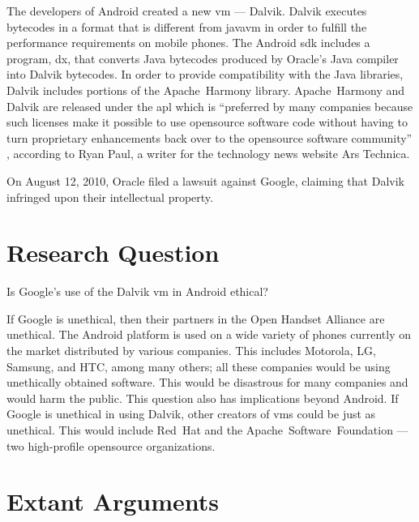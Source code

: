 \documentclass[11pt]{article}
\begin{document}
\begin{multicols}{2}
The developers of Android created a new \gls{vm} --- Dalvik.  Dalvik executes
\glspl{bytecode} in a format that is different from \gls{javavm} in order to
fulfill the performance requirements on mobile phones.  \cite{dalvik-bytecode}
\cite{dalvik-vm-arch} The Android \gls{sdk} includes a program, dx, that
converts Java \glspl{bytecode} produced by Oracle's Java compiler into Dalvik
\glspl{bytecode}.  \cite{android-sdk-building} In order to provide compatibility
with the Java libraries, Dalvik includes portions of the Apache~Harmony library.
\cite{apache-harmony} \cite{dalvik-readme}  Apache~Harmony and Dalvik are
released under the \gls{apl} \cite{apache-license} which is ``preferred by many
companies because such licenses make it possible to use \gls{opensource}
software code without having to turn proprietary enhancements back over to the
\gls{opensource} software community'' \cite{why-apache2-license}, according to
Ryan Paul, a writer for the technology news website Ars Technica.

On August 12, 2010, Oracle filed a lawsuit against Google, claiming that Dalvik
infringed upon their intellectual property. \cite[Count VIII]{oracle-lawsuit}


\section{Research Question} %
\label{sec:question}

Is Google's use of the Dalvik \gls{vm} in Android ethical?

If Google is unethical, then their partners in the Open Handset Alliance are
unethical.  The Android platform is used on a wide variety of phones currently
on the market distributed by various companies.  This includes Motorola, LG,
Samsung, and HTC, among many others; all these companies would be using
unethically obtained software.  This would be disastrous for many companies and
would harm the public.  This question also has implications beyond Android.  If
Google is unethical in using Dalvik, other creators of \glspl{vm} could be just
as unethical.  This would include Red~Hat and the Apache~Software~Foundation ---
two high-profile \gls{opensource} organizations.


\section{Extant Arguments} %
\label{sec:args}


\end{multicols}
\end{document}
